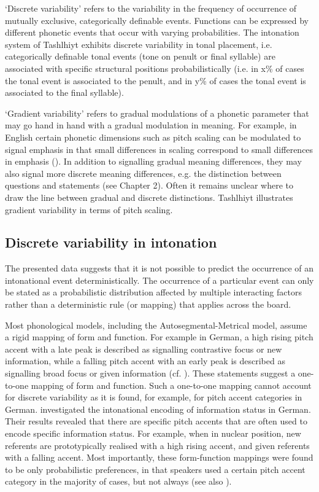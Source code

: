 ‘Discrete variability’ refers to the variability in the frequency of occurrence of mutually exclusive, categorically definable events. Functions can be expressed by different phonetic events that occur with varying probabilities. The intonation system of Tashlhiyt exhibits discrete variability in tonal placement, i.e. categorically definable tonal events (tone on penult or final syllable) are associated with specific structural positions probabilistically (i.e. in x\% of cases the tonal event is associated to the penult, and in y\% of cases the tonal event is associated to the final syllable).

‘Gradient variability’ refers to gradual modulations of a phonetic parameter that may go hand in hand with a gradual modulation in meaning. For example, in English certain phonetic dimensions such as pitch scaling can be modulated to signal emphasis in that small differences in scaling correspond to small differences in emphasis (\citealt{Bolinger1961,Ladd2014}). In addition to signalling gradual meaning differences, they may also signal more discrete meaning differences, e.g. the distinction between questions and statements (see Chapter 2). Often it remains unclear where to draw the line between gradual and discrete distinctions. Tashlhiyt illustrates gradient variability in terms of pitch scaling. 

\subsection{Discrete variability in intonation}  
The presented data suggests that it is not possible to predict the occurrence of an intonational event deterministically. The occurrence of a particular event can only be stated as a probabilistic distribution affected by multiple interacting factors rather than a deterministic rule (or mapping) that applies across the board.

Most phonological models, including the Autosegmental-Metrical model, assume a rigid mapping of form and function. For example in German, a high rising pitch accent with a late peak is described as signalling contrastive focus or new information, while a falling pitch accent with an early peak is described as signalling broad focus or given information (cf. \citealt{Grice.etal2005ger,kohler2006,FeryKuegler2008,RitterGrice2015}). These statements suggest a one-to-one mapping of form and function. Such a one-to-one mapping cannot account for discrete variability as it is found, for example, for pitch accent categories in German. \citet{Baumann.etal2015} investigated the intonational encoding of information status in German. Their results revealed that there are specific pitch accents that are often used to encode specific information status. For example, when in nuclear position, new referents are prototypically realised with a high rising accent, and given referents with a falling accent. Most importantly, these form-function mappings were found to be only probabilistic preferences, in that speakers used a certain pitch accent category in the majority of cases, but not always (see also \citealt{Schafer.etal2000,MueckeGrice2014,CangemiGrice2016,Grice.etal.accepted}).

